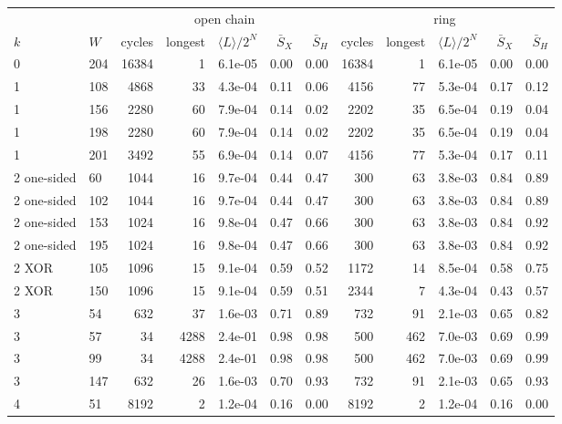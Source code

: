 \begin{tabular}{llrrrrr|rrrrr}
\toprule
 & & \multicolumn{5}{c|}{open chain} & \multicolumn{5}{c}{ring} \\
$k$ & $W$ & cycles & longest & $\langle L\rangle/2^N$ & $\bar S_X$ & $\bar S_H$ & cycles & longest & $\langle L\rangle/2^N$ & $\bar S_X$ & $\bar S_H$ \\
\midrule
0 & 204 & 16384 & 1 & 6.1e-05 & 0.00 & 0.00 & 16384 & 1 & 6.1e-05 & 0.00 & 0.00 \\
1 & 108 & 4868 & 33 & 4.3e-04 & 0.11 & 0.06 & 4156 & 77 & 5.3e-04 & 0.17 & 0.12 \\
1 & 156 & 2280 & 60 & 7.9e-04 & 0.14 & 0.02 & 2202 & 35 & 6.5e-04 & 0.19 & 0.04 \\
1 & 198 & 2280 & 60 & 7.9e-04 & 0.14 & 0.02 & 2202 & 35 & 6.5e-04 & 0.19 & 0.04 \\
1 & 201 & 3492 & 55 & 6.9e-04 & 0.14 & 0.07 & 4156 & 77 & 5.3e-04 & 0.17 & 0.11 \\
2 one-sided & 60 & 1044 & 16 & 9.7e-04 & 0.44 & 0.47 & 300 & 63 & 3.8e-03 & 0.84 & 0.89 \\
2 one-sided & 102 & 1044 & 16 & 9.7e-04 & 0.44 & 0.47 & 300 & 63 & 3.8e-03 & 0.84 & 0.89 \\
2 one-sided & 153 & 1024 & 16 & 9.8e-04 & 0.47 & 0.66 & 300 & 63 & 3.8e-03 & 0.84 & 0.92 \\
2 one-sided & 195 & 1024 & 16 & 9.8e-04 & 0.47 & 0.66 & 300 & 63 & 3.8e-03 & 0.84 & 0.92 \\
2 XOR & 105 & 1096 & 15 & 9.1e-04 & 0.59 & 0.52 & 1172 & 14 & 8.5e-04 & 0.58 & 0.75 \\
2 XOR & 150 & 1096 & 15 & 9.1e-04 & 0.59 & 0.51 & 2344 & 7 & 4.3e-04 & 0.43 & 0.57 \\
3 & 54 & 632 & 37 & 1.6e-03 & 0.71 & 0.89 & 732 & 91 & 2.1e-03 & 0.65 & 0.82 \\
3 & 57 & 34 & 4288 & 2.4e-01 & 0.98 & 0.98 & 500 & 462 & 7.0e-03 & 0.69 & 0.99 \\
3 & 99 & 34 & 4288 & 2.4e-01 & 0.98 & 0.98 & 500 & 462 & 7.0e-03 & 0.69 & 0.99 \\
3 & 147 & 632 & 26 & 1.6e-03 & 0.70 & 0.93 & 732 & 91 & 2.1e-03 & 0.65 & 0.93 \\
4 & 51 & 8192 & 2 & 1.2e-04 & 0.16 & 0.00 & 8192 & 2 & 1.2e-04 & 0.16 & 0.00 \\
\bottomrule
\end{tabular}
